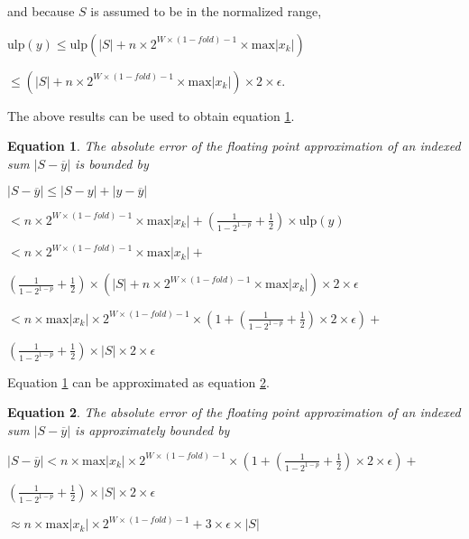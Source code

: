\documentclass[12pt]{article}
\providecommand{\max}{\ensuremath{\text{max}}}
\providecommand{\ulp}{\ensuremath{\text{ulp}}}
\theoremstyle{plain}
\newtheorem{eq}{Equation}[section]
\begin{document}
    and because $S$ is assumed to be in the normalized range,

    $\ulp(y) \leq \ulp(|S| + n \times 2^{W \times (1 - fold) - 1} \times \max|x_k|)$

    \indent \indent$\leq (|S| + n \times 2^{W \times (1 - fold) - 1} \times \max|x_k|) \times 2 \times \epsilon$.

    The above results can be used to obtain equation \ref{eq:error}.

    \begin{eq} The absolute error of the floating point approximation of an indexed sum $|S - \overline{y}|$ is bounded by

      $|S - \overline{y}| \leq |S - y| + |y - \overline{y}|$

      \indent\indent$< n \times 2^{W \times (1 - fold) - 1} \times \max|x_k| + (\frac{1}{1 - 2^{1 - p}} + \frac{1}{2})\times \ulp(y)$

      \indent\indent$< n \times 2^{W \times (1 - fold) - 1} \times \max|x_k| + $

      \indent\indent \indent$(\frac{1}{1 - 2^{1 - p}} + \frac{1}{2})\times(|S| + n \times 2^{W \times (1 - fold) - 1} \times \max|x_k|) \times 2 \times \epsilon$

      \indent\indent$< n \times \max|x_k|\times 2^{W \times (1 - fold) - 1} \times(1 + (\frac{1}{1 - 2^{1 - p}} + \frac{1}{2}) \times 2 \times \epsilon) + $

      \indent\indent \indent$(\frac{1}{1 - 2^{1 - p}} + \frac{1}{2})\times |S| \times 2 \times \epsilon$
      \label{eq:error}
    \end{eq}

    Equation \ref{eq:error} can be approximated as equation \ref{eq:errorapprox}.

    \begin{eq} The absolute error of the floating point approximation of an indexed sum $|S - \overline{y}|$ is approximately bounded by

      $|S - \overline{y}| < n \times \max|x_k|\times 2^{W \times (1 - fold) - 1} \times(1 + (\frac{1}{1 - 2^{1 - p}} + \frac{1}{2}) \times 2 \times \epsilon) + $

      \indent \indent$(\frac{1}{1 - 2^{1 - p}} + \frac{1}{2})\times |S| \times 2 \times \epsilon$

      \indent\indent$\approx n \times \max|x_k|\times 2^{W \times (1 - fold) - 1} + 3 \times \epsilon \times |S|$
      \label{eq:errorapprox}
    \end{eq}
\end{document}
